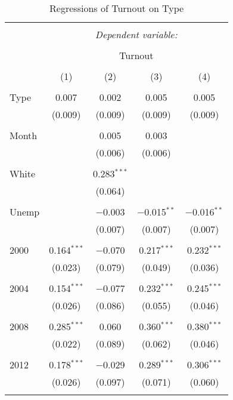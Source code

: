 \documentclass[12pt]{article}
\begin{document}
		\begin{table}[H] \centering 
		\caption{Regressions of Turnout on Type} 
		\label{} 
		\small 
		\begin{tabular}{@{\extracolsep{5pt}}lcccc} 
			\\[-1.8ex]\hline 
			\hline \\[-1.8ex] 
			& \multicolumn{4}{c}{\textit{Dependent variable:}} \\ 
			\cline{2-5} 
			\\[-1.8ex] & \multicolumn{4}{c}{Turnout} \\ 
			\\[-1.8ex] & (1) & (2) & (3) & (4)\\ 
			\hline \\[-1.8ex] 
			Type & 0.007 & 0.002 & 0.005 & 0.005 \\ 
			& (0.009) & (0.009) & (0.009) & (0.009) \\ 
			& & & & \\ 
			Month &  & 0.005 & 0.003 &  \\ 
			&  & (0.006) & (0.006) &  \\ 
			& & & & \\ 
			White &  & 0.283$^{***}$ &  &  \\ 
			&  & (0.064) &  &  \\ 
			& & & & \\ 
			Unemp &  & $-$0.003 & $-$0.015$^{**}$ & $-$0.016$^{**}$ \\ 
			&  & (0.007) & (0.007) & (0.007) \\ 
			& & & & \\ 
			2000 & 0.164$^{***}$ & $-$0.070 & 0.217$^{***}$ & 0.232$^{***}$ \\ 
			& (0.023) & (0.079) & (0.049) & (0.036) \\ 
			& & & & \\ 
			2004 & 0.154$^{***}$ & $-$0.077 & 0.232$^{***}$ & 0.245$^{***}$ \\ 
			& (0.026) & (0.086) & (0.055) & (0.046) \\ 
			& & & & \\ 
			2008 & 0.285$^{***}$ & 0.060 & 0.360$^{***}$ & 0.380$^{***}$ \\ 
			& (0.022) & (0.089) & (0.062) & (0.046) \\ 
			& & & & \\ 
			2012 & 0.178$^{***}$ & $-$0.029 & 0.289$^{***}$ & 0.306$^{***}$ \\ 
			& (0.026) & (0.097) & (0.071) & (0.060) \\ 
			& & & & \\ 

\end{tabular}
\end{table}
\end{document}
